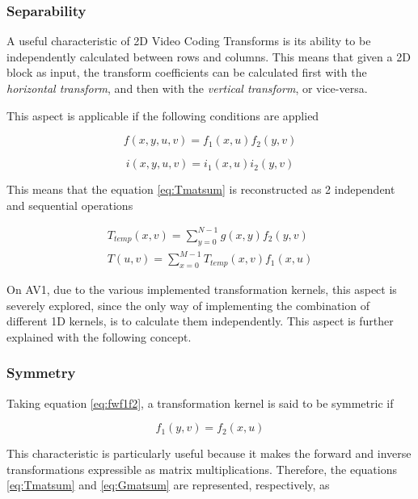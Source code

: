 \subsubsection{Separability}

A useful characteristic of 2D Video Coding Transforms is its ability to be independently calculated between rows and columns. This means that given a 2D block as input, the transform coefficients can be calculated first with the \emph{horizontal transform}, and then with the \emph{vertical transform}, or vice-versa.

This aspect is applicable if the following conditions are applied

\begin{equation} \label{eq:fwf1f2}
    f(x,y,u,v)=f_1(x,u)f_2(y,v)
\end{equation}


\begin{equation} \label{eq:ini1i2}
    i(x,y,u,v)=i_1(x,u)i_2(y,v)
\end{equation}

This means that the equation \ref{eq:Tmatsum} is reconstructed as 2 independent and sequential operations

\begin{gather}
    T_{temp}(x,v) = \sum_{y=0}^{N-1}g(x,y)f_2(y,v) \\
    T(u,v) = \sum_{x=0}^{M-1}T_{temp}(x,v)f_1(x,u)
\end{gather}

On AV1, due to the various implemented transformation kernels, this aspect is severely explored, since the only way of implementing the combination of different 1D kernels, is to calculate them independently. This aspect is further explained with the following concept.

\subsubsection{Symmetry}

Taking equation \ref{eq:fwf1f2}, a transformation kernel is said to be symmetric if 

\begin{equation}
    f_1(y,v) = f_2(x,u)
\end{equation}

This characteristic is particularly useful because it makes the forward and inverse transformations expressible as matrix multiplications. Therefore, the equations \ref{eq:Tmatsum} and \ref{eq:Gmatsum} are represented, respectively, as

